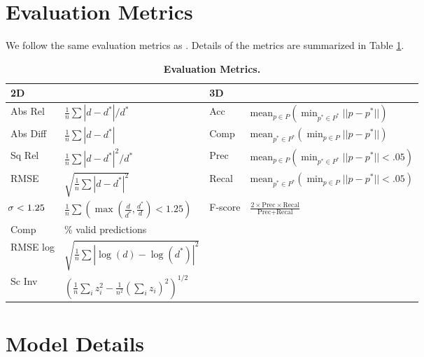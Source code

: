 \section{Evaluation Metrics}
We follow the same evaluation metrics as \cite{atlas, neucon}. Details of the metrics are summarized in Table \ref{table:metrics}.
\begin{table}[htb]
\tiny
\setlength\tabcolsep{0.1pt}
\begin{tabular*}{\columnwidth}{@{\extracolsep{\fill}} llll}
\hline
\multicolumn{2}{l}{2D} & \multicolumn{2}{l}{3D} \\ \hline
Abs Rel             & $\frac{1}{n}\sum\left|d-d^*\right|/d^*$      & Acc       & $\text{mean}_{p \in P}\left(\min_{p^* \in P^*}||p-p^*||\right)$\\
Abs Diff            & $\frac{1}{n}\sum\left|d-d^*\right|$          & Comp      & $\text{mean}_{p^* \in P^*}\left(\min_{p \in P}||p-p^*||\right)$\\
Sq Rel              & $\frac{1}{n}\sum\left|d-d^*\right|^2/d^*$    & Prec      & $\text{mean}_{p \in P}\left(\min_{p^* \in P^*}||p-p^*||<.05\right)$\\
RMSE                & $\sqrt{\frac{1}{n}\sum\left|d-d^*\right|^2}$ & Recal     & $\text{mean}_{p^* \in P^*}\left(\min_{p \in P}||p-p^*||<.05\right)$\\
$\tiny\mkern-5mu\sigma<1.25$   & $\frac{1}{n}\sum\left(\max\left(\frac{d}{d^*}, \frac{d^*}{d}\right)<1.25\right)$ & F-score  & $\frac{2 \times \text{Prec} \times \text{Recal}}{\text{Prec} + \text{Recal}}$\\
Comp                & \% valid predictions &                        &                 \\
RMSE log            & $\sqrt{\frac{1}{n}\sum\left|\log(d)-\log(d^*)\right|^2}$   &                        &                 \\
Sc Inv              & $\left(\frac{1}{n}\sum_{i}z_i^2-\frac{1}{n^2}(\sum_i z_i)^2\right)^{1/2}$ &                        &                 \\ \hline
\end{tabular*}
\caption{\textbf{Evaluation Metrics.}}
\label{table:metrics}
\end{table}


\section{Model Details}
